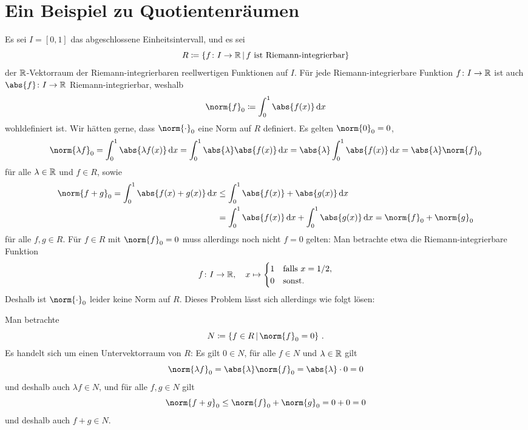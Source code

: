 \section*{Ein Beispiel zu Quotientenräumen}

Es sei $I = [0,1]$ das abgeschlossene Einheitsintervall, und es sei
\[
            R
  \defined  \{
              f \colon I \to \Real
            \suchthat
              \text{$f$ ist Riemann-integrierbar}
            \}
\]
der $\mathbb{R}$-Vektorraum der Riemann-integrierbaren reellwertigen Funktionen auf $I$.
Für jede Riemann-integrierbare Funktion $f \colon I \to \mathbb{R}$ ist auch $\abs{f} \colon I \to \Real$ Riemann-integrierbar, weshalb
\[
            \norm{f}_0
  \defined  \int_0^1 \abs{f(x)} \,\text{d}x
\]
wohldefiniert ist.
Wir hätten gerne, dass $\norm{\cdot}_0$ eine Norm auf $R$ definiert.
Es gelten $\norm{0}_0 = 0$, 
\[
    \norm{\lambda f}_0
  = \int_0^1 \abs{\lambda f(x)}  \,\text{d}x
  = \int_0^1 \abs{\lambda} \abs{f(x)} \,\text{d}x
  = \abs{\lambda} \int_0^1 \abs{f(x)} \,\text{d}x
  = \abs{\lambda} \norm{f}_0
\]
für alle $\lambda \in \mathbb{R}$ und $f \in R$, sowie
\begin{align*}
        \norm{f + g}_0
  =     \int_0^1 \abs{f(x) + g(x)} \,\text{d}x
  &\leq \int_0^1 \abs{f(x)} + \abs{g(x)} \,\text{d}x  \\
  &=    \int_0^1 \abs{f(x)} \,\text{d}x + \int_0^1 \abs{g(x)} \,\text{d}x
  =     \norm{f}_0 + \norm{g}_0
\end{align*}
für alle $f, g \in R$.
Für $f \in R$ mit $\norm{f}_0 = 0$ muss allerdings noch nicht $f = 0$ gelten:
Man betrachte etwa die Riemann-integrierbare Funktion
\[
          f
  \colon  I
  \to     \mathbb{R},
  \quad   x
  \mapsto \begin{cases}
            1 & \text{falls $x = 1/2$}, \\
            0 & \text{sonst}.
          \end{cases}
\]
Deshalb ist $\norm{\cdot}_0$ leider keine Norm auf $R$.
Dieses Problem lässt sich allerdings wie folgt lösen:

Man betrachte
\[
            N
  \defined  \left\{
              f \in R
            \suchthat
              \norm{f}_0 = 0
            \right\} \,.
\]
Es handelt sich um einen Untervektorraum von $R$:
Es gilt $0 \in N$, für alle $f \in N$ und $\lambda \in \mathbb{R}$ gilt
\[
    \norm{\lambda f}_0
  = \abs{\lambda} \norm{f}_0
  = \abs{\lambda} \cdot 0
  = 0
\]
und deshalb auch $\lambda f \in N$, und für alle $f, g \in N$ gilt
\[
        \norm{f + g}_0
  \leq  \norm{f}_0 + \norm{g}_0
  =     0 + 0
  =     0
\]
und deshalb auch $f + g \in N$.

